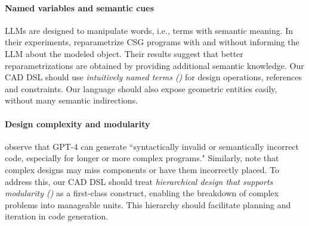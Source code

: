 \paragraph{Named variables and semantic cues}
LLMs are designed to manipulate words, i.e., terms with semantic meaning.
In their experiments, \cite{makatura2023can} reparametrize CSG programs with and without informing the LLM about the modeled object.
Their results suggest that better reparametrizations are obtained by providing additional semantic knowledge.
Our CAD DSL should use \emph{intuitively named terms (\dgthree{})} for design operations, references and constraints.
Our language should also expose geometric entities easily, without many semantic indirections.

\paragraph{Design complexity and modularity}
\cite{bubeck2023sparks} observe that GPT-4 can generate ``syntactically invalid or semantically incorrect code, especially for longer or more complex programs." Similarly, \cite{makatura2023can} note that complex designs may miss components or have them incorrectly placed. To address this, our CAD DSL should treat \emph{hierarchical design that supports modularity (\dgfour{})} as a first-class construct, enabling the breakdown of complex problems into manageable units. This hierarchy should facilitate planning and iteration in code generation.




